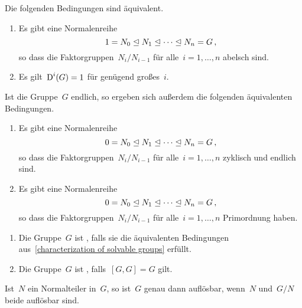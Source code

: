 \begin{proposition}
  \label{characterization of solvable groups}
  Die folgenden Bedingungen sind äquivalent.
  \begin{enumerate}
    \item
      Es gibt eine Normalenreihe
      \[
        1
        =
        N_0
        \trianglelefteq
        N_1
        \trianglelefteq
        \dotsb
        \trianglelefteq
        N_n
        =
        G \,,
      \]
      so dass die Faktorgruppen~$N_i / N_{i-1}$ für alle~$i = 1, \dotsc, n$ abelsch sind.
    \item
      Es gilt~$\operatorname{D}^i(G) = 1$ für genügend großes~$i$.
  \end{enumerate}
  Ist die Gruppe~$G$ endlich, so ergeben sich außerdem die folgenden äquivalenten Bedingungen.
  \begin{enumerate}[resume*]
    \item
      Es gibt eine Normalenreihe
      \[
        0
        =
        N_0
        \trianglelefteq
        N_1
        \trianglelefteq
        \dotsb
        \trianglelefteq
        N_n
        =
        G \,,
      \]
      so dass die Faktorgruppen~$N_i / N_{i-1}$ für alle~$i = 1, \dotsc, n$ zyklisch und endlich sind.
    \item
      Es gibt eine Normalenreihe
      \[
        0
        =
        N_0
        \trianglelefteq
        N_1
        \trianglelefteq
        \dotsb
        \trianglelefteq
        N_n
        =
        G \,,
      \]
      so dass die Faktorgruppen~$N_i / N_{i-1}$ für alle~$i = 1, \dotsc, n$ Primordnung haben.
  \end{enumerate}
\end{proposition}

\begin{definition}
  \leavevmode
  \begin{enumerate}
    \item
      Die Gruppe~$G$ ist , falls sie die äquivalenten Bedingungen aus~\cref{characterization of solvable groups} erfüllt.
    \item
      Die Gruppe~$G$ ist , falls~$[G, G] = G$ gilt.
  \end{enumerate}
\end{definition}

\begin{lemma}
  \label{solveable via ses}
  Ist~$N$ ein Normalteiler in~$G$, so ist~$G$ genau dann auflösbar, wenn~$N$ und~$G/N$ beide auflösbar sind.
\end{lemma}

